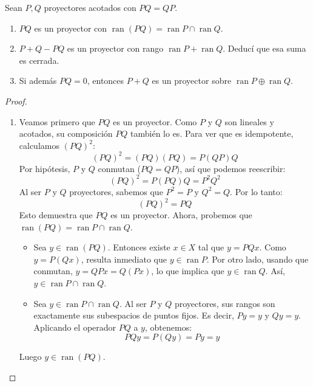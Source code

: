 \documentclass{article}
\theoremstyle{definition}
\newenvironment{ejercicio}[1]{\begin{trivlist}
\item[\hskip \labelsep {\bfseries Ejercicio}\hskip \labelsep {\bfseries #1.}]}{\end{trivlist}}
\begin{document}
\begin{ejercicio}{3}
	Sean \( P, Q \) proyectores acotados con \( PQ = QP \).
	\begin{enumerate}
		\item \( PQ \) es un proyector con \( \operatorname{ran}(PQ) = \operatorname{ran} P \cap \operatorname{ran} Q \).
		\item \( P + Q - PQ \) es un proyector con rango \( \operatorname{ran} P + \operatorname{ran} Q \). Deducí que esa suma es cerrada.
		\item Si además \( PQ = 0 \), entonces \( P + Q \) es un proyector sobre \( \operatorname{ran} P \oplus \operatorname{ran} Q \).
	\end{enumerate}
\end{ejercicio}
\begin{proof}
	\begin{enumerate}
		\item Veamos primero que \(PQ\) es un proyector. Como \(P\) y \(Q\) son lineales y acotados, su composición \(PQ\) también lo es. Para ver que es idempotente, calculamos \({(PQ)}^2\):
		      \[ {(PQ)}^2 = (PQ)(PQ) = P(QP)Q \]
		      Por hipótesis, \(P\) y \(Q\) conmutan (\(PQ = QP\)), así que podemos reescribir:
		      \[{(PQ)}^2 = P(PQ)Q = P^2 Q^2\]
		      Al ser \(P\) y \(Q\) proyectores, sabemos que \(P^2 = P\) y \(Q^2 = Q\). Por lo tanto:
		      \[{(PQ)}^2 = PQ\]
		      Esto demuestra que \(PQ\) es un proyector.
		      Ahora, probemos que \(\operatorname{ran}(PQ) = \operatorname{ran} P \cap \operatorname{ran} Q\).\begin{itemize}
			      \item[(\(\subseteq \))] Sea \(y \in \operatorname{ran}(PQ)\). Entonces existe \(x \in X\) tal que \(y = PQx\). Como \(y = P(Qx)\), resulta inmediato que \(y \in \operatorname{ran} P\). Por otro lado, usando que conmutan, \(y = QPx = Q(Px)\), lo que implica que \(y \in \operatorname{ran} Q\). Así, \(y \in \operatorname{ran} P \cap \operatorname{ran} Q\).
			      \item[(\(\supseteq \))] Sea \(y \in \operatorname{ran} P \cap \operatorname{ran} Q\). Al ser \(P\) y \(Q\) proyectores, sus rangos son exactamente sus subespacios de puntos fijos. Es decir, \(Py = y\) y \(Qy = y\). Aplicando el operador \(PQ\) a \(y\), obtenemos:
			            \[ PQy = P(Qy) = Py = y \]
		      \end{itemize}
		      Luego \(y \in \operatorname{ran}(PQ)\).


\end{enumerate}
\end{proof}
\end{document}
